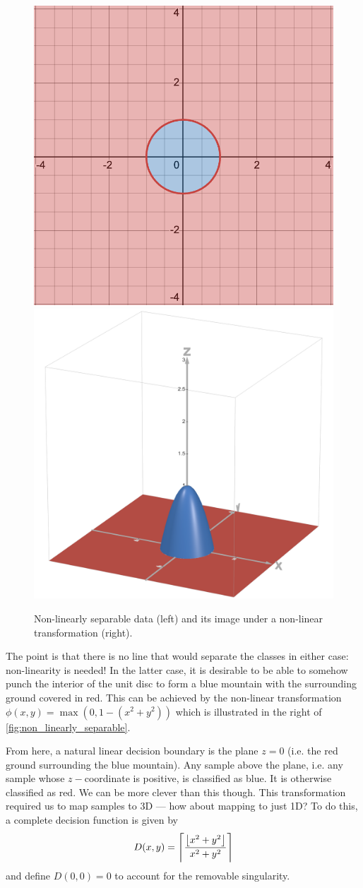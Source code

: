 \documentclass[11pt]{article}
\begin{document}
\begin{figure}[t]
    \centering
    \includegraphics[width=0.40\columnwidth]{./figures/neural_nets/NLA_circle.png}
    \hspace{20pt}
    \includegraphics[width=0.40\columnwidth]{./figures/neural_nets//NLA_non_lin_transform.png}
    \caption{Non-linearly separable data (left) and its image under a non-linear transformation (right).}
    \label{fig:non_linearly_separable}
\end{figure}

The point is that there is no line that would separate the classes in either case: non-linearity is needed! In the latter case, it is desirable to be able to somehow punch the interior of the unit disc to form a blue mountain with the surrounding ground covered in red. This can be achieved by the non-linear transformation $\phi(x,y)=\max(0,1-(x^2+y^2))$ which is illustrated in the right of \autoref{fig:non_linearly_separable}.

From here, a natural linear decision boundary is the plane $z=0$ (i.e. the red ground surrounding the blue mountain). Any sample above the plane, i.e. any sample whose $z-$coordinate is positive, is classified as blue. It is otherwise classified as red. We can be more clever than this though. This transformation required us to map samples to 3D — how about mapping to just 1D? To do this, a complete decision function is given by
$$
D(x,y)=\left\lceil\frac{\left\lfloor x^2+y^2\right\rfloor}{x^2+y^2}\right\rceil
$$
and define $D(0,0)=0$ to account for the removable singularity.
\end{document}
